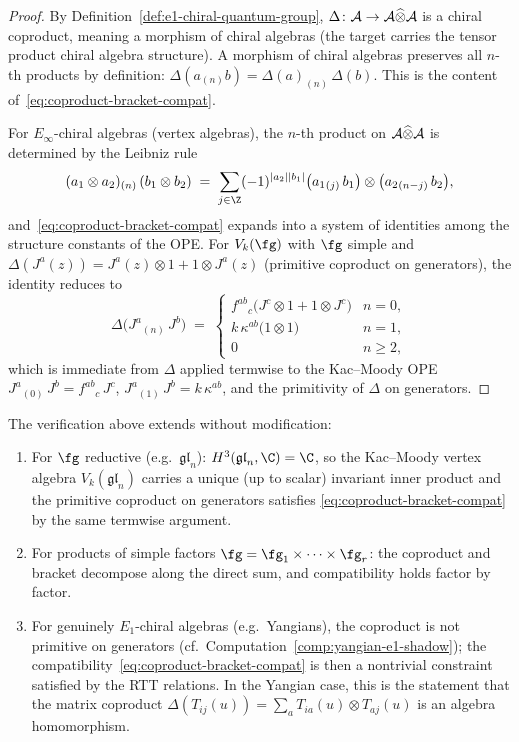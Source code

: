 \begin{proof}
By Definition~\ref{def:e1-chiral-quantum-group},
$\Delta \colon \mathcal{A} \to \mathcal{A} \widehat\otimes \mathcal{A}$ is a chiral
coproduct, meaning a morphism of chiral algebras (the target
carries the tensor product chiral algebra structure). A morphism
of chiral algebras preserves all $n$-th products by definition:
$\Delta(a_{(n)}b) = \Delta(a)_{(n)}\,\Delta(b)$. This is the
content of~\eqref{eq:coproduct-bracket-compat}.

For $E_\infty$-chiral algebras (vertex algebras), the $n$-th
product on $\mathcal{A} \widehat\otimes \mathcal{A}$ is determined by the
Leibniz rule
\[
(a_1 \otimes a_2)_{(n)}\,(b_1 \otimes b_2)
\;=\;
\sum_{j \in \Z}
(-1)^{|a_2||b_1|}
\bigl(a_1{}_{(j)}\,b_1\bigr) \otimes
\bigl(a_2{}_{(n-j)}\,b_2\bigr),
\]
and~\eqref{eq:coproduct-bracket-compat} expands into a
system of identities among the structure constants of
the OPE. For $V_k(\fg)$ with $\fg$ simple and
$\Delta(J^a(z)) = J^a(z) \otimes 1 + 1 \otimes J^a(z)$
(primitive coproduct on generators), the identity reduces to
\[
\Delta\bigl(J^a{}_{(n)}\,J^b\bigr)
\;=\;
\begin{cases}
f^{ab}{}_c\bigl(J^c\otimes 1 + 1\otimes J^c\bigr)
& n = 0,\\[2pt]
k\,\kappa^{ab}\bigl(1\otimes 1\bigr)
& n = 1,\\[2pt]
0 & n \ge 2,
\end{cases}
\]
which is immediate from $\Delta$ applied termwise to the
Kac--Moody OPE $J^a{}_{(0)}\,J^b = f^{ab}{}_c\,J^c$,
$J^a{}_{(1)}\,J^b = k\,\kappa^{ab}$, and the primitivity
of $\Delta$ on generators.
\end{proof}

\begin{remark}%
\label{rem:coproduct-bracket-compat-extensions}%
%
The verification above extends without modification:
\begin{enumerate}[label=\textup{(\roman*)},nosep]
\item For $\fg$ reductive (e.g.\ $\mathfrak{gl}_n$):
 $H^3(\mathfrak{gl}_n, \C) = \C$, so the Kac--Moody
 vertex algebra $V_k(\mathfrak{gl}_n)$ carries a unique
 (up to scalar) invariant inner product and the primitive
 coproduct on generators satisfies
 \eqref{eq:coproduct-bracket-compat} by the same termwise
 argument.
\item For products of simple factors
 $\fg = \fg_1 \times \cdots \times \fg_r$: the coproduct
 and bracket decompose along the direct sum, and
 compatibility holds factor by factor.
\item For genuinely $E_1$-chiral algebras (e.g.\ Yangians),
 the coproduct is not primitive on generators
 (cf.\ Computation~\textup{\ref{comp:yangian-e1-shadow}});
 the compatibility~\eqref{eq:coproduct-bracket-compat}
 is then a nontrivial constraint satisfied by the RTT
 relations. In the Yangian case, this is the statement that
 the matrix coproduct
 $\Delta(T_{ij}(u)) = \sum_a T_{ia}(u) \otimes T_{aj}(u)$
 is an algebra homomorphism.
\end{enumerate}
\end{remark}

